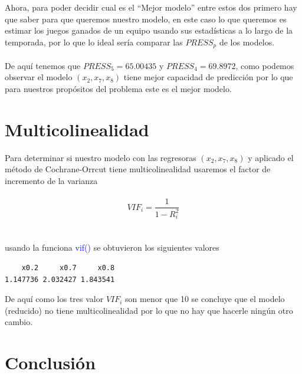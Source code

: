 \documentclass[11pt]{beamer}
\begin{document}
\begin{frame}

Ahora, para poder decidir cual es el ``Mejor modelo'' entre estos dos primero hay que saber para que queremos nuestro modelo, en este caso lo que queremos es estimar los juegos ganados de un equipo usando sus estadísticas a lo largo de la temporada, por lo que lo ideal sería comparar las $PRESS_{p}$ de los modelos.\\~\\

De aquí tenemos que $PRESS_{5}=65.00435$ y $PRESS_{4}=69.8972$, como podemos observar el modelo $(x_{2},x_{7},x_{8})$ tiene mejor capacidad de predicción por lo que para nuestros propósitos del problema este es el mejor modelo.

\end{frame}

\section{Multicolinealidad}

\begin{frame}
\tableofcontents[currentsection]
\end{frame}

\begin{frame}[fragile]
Para determinar si nuestro modelo con las regresoras $(x_{2},x_{7},x_{8})$ y aplicado el método de Cochrane-Orrcut tiene multicolinealidad usaremos el factor de incremento de la varianza \\~\\

\[VIF_{i}=\frac{1}{1-R_{i}^{2}}\]\\~\\

usando la funciona \textcolor{blue}{vif()} se obtuvieron los siguientes valores

\begin{lstlisting}
    x0.2     x0.7     x0.8 
1.147736 2.032427 1.843541 
\end{lstlisting}

\end{frame}

\begin{frame}
De aquí como los tres valor $VIF_{i}$ son menor que 10 se concluye que el modelo (reducido) no tiene multicolinealidad por lo que no hay que hacerle ningún otro cambio.
\end{frame}

\section{Conclusión}
\end{document}

